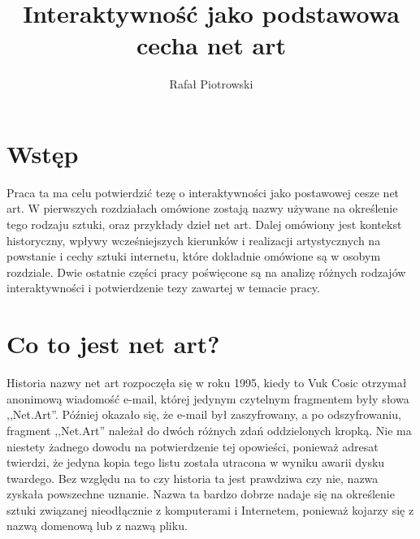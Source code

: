 \documentclass[a4paper,12pt,twoside]{article}
\author{Rafał Piotrowski}
\title{Interaktywność jako podstawowa cecha net art}
\begin{document}
\maketitle


\section{Wstęp}
Praca ta ma celu potwierdzić tezę o interaktywności
jako postawowej cesze net art. W pierwszych rozdziałach omówione
zostają nazwy używane na określenie tego rodzaju sztuki,
oraz przykłady dzieł net art. Dalej omówiony jest kontekst historyczny,
wpływy wcześniejszych kierunków i realizacji artystycznych na powstanie
i cechy sztuki internetu, które dokładnie omówione są w osobym rozdziale.
Dwie ostatnie części pracy poświęcone są na analizę różnych rodzajów
interaktywności i potwierdzenie tezy zawartej w temacie pracy.

\section{Co to jest net art?}

Historia nazwy net art rozpoczęła się w roku 1995, kiedy to Vuk Cosic
otrzymał anonimową wiadomość e-mail, której jedynym czytelnym fragmentem
były słowa ,,Net.Art''. Później okazało się, że e-mail był zaszyfrowany,
a po odszyfrowaniu, fragment ,,Net.Art'' należał do dwóch różnych zdań
oddzielonych kropką. Nie ma niestety żadnego dowodu na potwierdzenie
tej opowieści, ponieważ adresat twierdzi, że jedyna kopia tego listu
została utracona w wyniku awarii dysku twardego. Bez względu na to
czy historia ta jest prawdziwa czy nie, nazwa zyskała powszechne uznanie.
Nazwa ta bardzo dobrze nadaje się na określenie sztuki związanej
nieodłącznie z komputerami i Internetem, ponieważ kojarzy się
z nazwą domenową lub z nazwą pliku.
\end{document}
